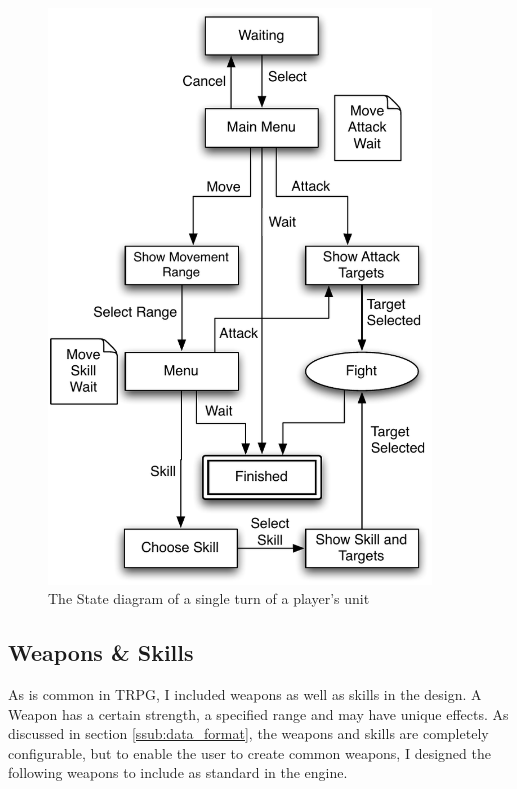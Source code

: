 
\begin{figure}[h]
	\centering
		\includegraphics[width=4in]{figures/unit.pdf}
	\caption{The State diagram of a single turn of a player's unit}
	\label{fig:figures_unit}
\end{figure}

\clearpage
\subsection{Weapons \& Skills}

As is common in TRPG, I included weapons as  well as skills in the design.  A Weapon has a certain strength, a specified range and may have unique effects.  As discussed in  section \ref{ssub:data_format},  the weapons and skills are completely configurable, but to enable the user to create common weapons, I designed the following weapons to include as standard in the engine.  

